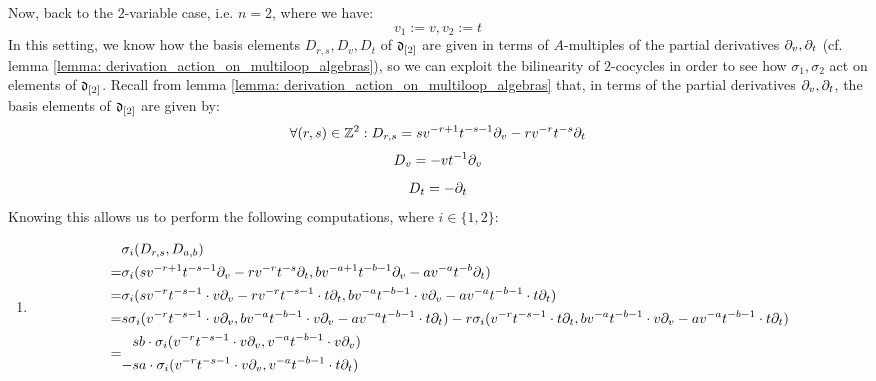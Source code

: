 \begin{example}
            Now, back to the $2$-variable case, i.e. $n = 2$, where we have:
                $$v_1 := v, v_2 := t$$
            In this setting, we know how the basis elements $D_{r, s}, D_v, D_t$ of $\d_{[2]}$ are given in terms of $A$-multiples of the partial derivatives $\del_v, \del_t$ (cf. lemma \ref{lemma: derivation_action_on_multiloop_algebras}), so we can exploit the bilinearity of $2$-cocycles in order to see how $\sigma_1, \sigma_2$ act on elements of $\d_{[2]}$. Recall from lemma \ref{lemma: derivation_action_on_multiloop_algebras} that, in terms of the partial derivatives $\del_v, \del_t$, the basis elements of $\d_{[2]}$ are given by:
                $$\forall (r, s) \in \Z^2: D_{r, s} = s v^{-r + 1} t^{-s - 1} \del_v - r v^{-r} t^{-s} \del_t$$
                $$D_v = -v t^{-1} \del_v$$
                $$D_t = -\del_t$$
            Knowing this allows us to perform the following computations, where $i \in \{1, 2\}$:
            \begin{enumerate}
                \item 
                    $$
                        \begin{aligned}
                            & \sigma_i(D_{r, s}, D_{a, b})
                            \\
                            = & \sigma_i( s v^{-r + 1} t^{-s - 1} \del_v - r v^{-r} t^{-s} \del_t, b v^{-a + 1} t^{-b - 1} \del_v - a v^{-a} t^{-b} \del_t )
                            \\
                            = & \sigma_i( s v^{-r} t^{-s - 1} \cdot v\del_v - r v^{-r} t^{-s - 1} \cdot t \del_t, b v^{-a} t^{-b - 1} \cdot v\del_v - a v^{-a} t^{-b - 1} \cdot t \del_t )
                            \\
                            = & s \sigma_i( v^{-r} t^{-s - 1} \cdot v\del_v, b v^{-a} t^{-b - 1} \cdot v\del_v - a v^{-a} t^{-b - 1} \cdot t \del_t ) - r \sigma_i( v^{-r} t^{-s - 1} \cdot t \del_t, b v^{-a} t^{-b - 1} \cdot v\del_v - a v^{-a} t^{-b - 1} \cdot t \del_t )
                            \\
                            = &
                            \begin{aligned}
                                & s b \cdot \sigma_i( v^{-r} t^{-s - 1} \cdot v\del_v, v^{-a} t^{-b - 1} \cdot v\del_v )
                                \\
                                - & s a \cdot \sigma_i( v^{-r} t^{-s - 1} \cdot v\del_v, v^{-a} t^{-b - 1} \cdot t \del_t )
                                \\

\end{aligned}
\end{aligned}$$
\end{enumerate}
\end{example}
